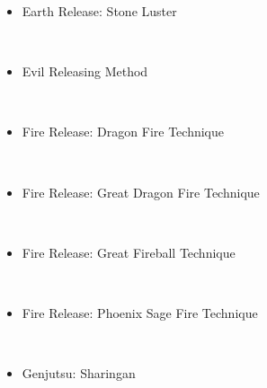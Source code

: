\documentclass[a4paper,12pt]{article}
\begin{document}
\begin{itemize}
\item Earth Release: Stone Luster
\end{itemize}\\ \par \vspace{0.5cm}

\begin{itemize}
\item Evil Releasing Method
\end{itemize}\\ \par \vspace{0.5cm}

\begin{itemize}
\item Fire Release: Dragon Fire Technique
\end{itemize}\\ \par \vspace{0.5cm}

\begin{itemize}
\item Fire Release: Great Dragon Fire Technique
\end{itemize}\\ \par \vspace{0.5cm}

\begin{itemize}
\item Fire Release: Great Fireball Technique
\end{itemize}\\ \par \vspace{0.5cm}

\begin{itemize}
\item Fire Release: Phoenix Sage Fire Technique
\end{itemize}\\ \par \vspace{0.5cm}

\begin{itemize}
\item Genjutsu: Sharingan
\end{itemize}\\ \par \vspace{0.5cm}
\end{document}
